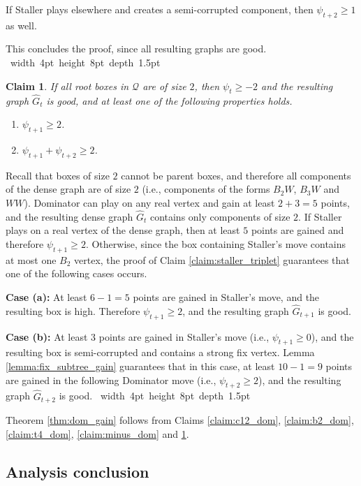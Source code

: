 \documentclass[11pt]{article}
\def\Proof{\par\noindent{\bf Proof:~}}
\def\blackslug{\hbox{\hskip 1pt \vrule width 4pt height 8pt
    depth 1.5pt \hskip 1pt}}
\def\QED{\quad\blackslug\lower 8.5pt\null\par}
\def\dnsitem{\vspace{-7pt}\item}
\newtheorem{claim}[theorem]{Claim}
\theoremstyle{definition}
\begin{document}
\smallskip
\par\noindent
	If Staller plays elsewhere and creates a semi-corrupted component, then $\psi_{t+2} \geq 1$ as well.
\bigskip
\par\noindent
This concludes the proof, since all resulting graphs are good.
\QED

\begin{claim}
\label{claim:t1_dom}
If all root boxes in $\mathcal{Q}$ are of size $2$, then $\psi_t \geq -2$ and the resulting graph $\hat{G}_t$ is good, and at least one of the following properties holds.
\begin{enumerate}
	\dnsitem $\psi_{t+1} \geq 2$.
	\dnsitem $\psi_{t+1} + \psi_{t+2} \geq 2$.
\end{enumerate}
\end{claim}
\Proof
Recall that boxes of size $2$ cannot be parent boxes, and therefore all components of the dense graph are of size $2$ (i.e., components of the forms $B_2W$, $B_3W$ and $WW$).
Dominator can play on any real vertex and gain at least $2 + 3 = 5$ points, and the resulting dense graph $\hat{G}_t$ contains only components of size $2$.
If Staller plays on a real vertex of the dense graph, then at least $5$ points are gained and therefore $\psi_{t+1} \geq 2$.
Otherwise, since the box containing Staller's move contains at most one $B_2$ vertex, the proof of Claim \ref{claim:staller_triplet} guarantees that one of the following cases occurs.
\smallskip
\par\noindent
{\bf Case (a):}
At least $6 - 1 = 5$ points are gained in Staller's move, and the resulting box is high.
Therefore $\psi_{t+1} \geq 2$, and the resulting graph $\hat{G}_{t+1}$ is good.
\smallskip
\par\noindent
{\bf Case (b):}
At least $3$ points are gained in Staller's move (i.e., $\psi_{t+1} \geq 0$), and the resulting box is semi-corrupted and contains a strong fix vertex. 
Lemma \ref{lemma:fix_subtree_gain} guarantees that in this case, at least $10 - 1 = 9$ points are gained in the following Dominator move (i.e., $\psi_{t+2} \geq 2$), and the resulting graph $\hat{G}_{t+2}$ is good.
\QED

Theorem \ref{thm:dom_gain} follows from Claims 
\ref{claim:c12_dom}, \ref{claim:b2_dom}, \ref{claim:t4_dom}, \ref{claim:minus_dom} and \ref{claim:t1_dom}.



\subsection{Analysis conclusion}
\label{sub:an_conclusion}
\end{document}
